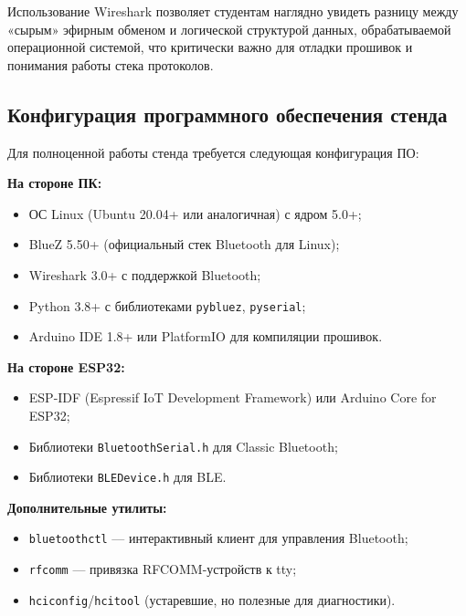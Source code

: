 Использование Wireshark позволяет студентам наглядно увидеть разницу между «сырым» эфирным обменом и логической структурой данных, обрабатываемой операционной системой, что критически важно для отладки прошивок и понимания работы стека протоколов.

\subsection{Конфигурация программного обеспечения стенда}

Для полноценной работы стенда требуется следующая конфигурация ПО:

\textbf{На стороне ПК:}
\begin{itemize}
    \item ОС Linux (Ubuntu 20.04+ или аналогичная) с ядром 5.0+;
    \item BlueZ 5.50+ (официальный стек Bluetooth для Linux);
    \item Wireshark 3.0+ с поддержкой Bluetooth;
    \item Python 3.8+ с библиотеками \texttt{pybluez}, \texttt{pyserial};
    \item Arduino IDE 1.8+ или PlatformIO для компиляции прошивок.
\end{itemize}

\textbf{На стороне ESP32:}
\begin{itemize}
    \item ESP-IDF (Espressif IoT Development Framework) или Arduino Core for ESP32;
    \item Библиотеки \texttt{BluetoothSerial.h} для Classic Bluetooth;
    \item Библиотеки \texttt{BLEDevice.h} для BLE.
\end{itemize}

\textbf{Дополнительные утилиты:}
\begin{itemize}
    \item \texttt{bluetoothctl} — интерактивный клиент для управления Bluetooth;
    \item \texttt{rfcomm} — привязка RFCOMM-устройств к tty;
    \item \texttt{hciconfig}/\texttt{hcitool} (устаревшие, но полезные для диагностики).
\end{itemize}
